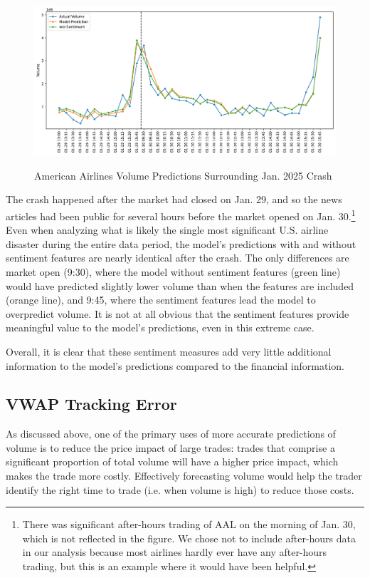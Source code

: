 \documentclass[12pt]{article}
\begin{document}
\begin{figure}[H]
    \centering
    \caption{American Airlines Volume Predictions Surrounding Jan. 2025 Crash}
    \includegraphics[width=\linewidth]{../Output/shap_aal_crash.pdf}
    \label{fig:shapley_aal_crash}
\end{figure}

The crash happened after the market had closed on Jan. 29, and so the news articles had been public for several hours before the market opened on Jan. 30.\footnote{There was significant after-hours trading of AAL on the morning of Jan. 30, which is not reflected in the figure. We chose not to include after-hours data in our analysis because most airlines hardly ever have any after-hours trading, but this is an example where it would have been helpful.} Even when analyzing what is likely the single most significant U.S. airline disaster during the entire data period, the model's predictions with and without sentiment features are nearly identical after the crash. The only differences are market open (9:30), where the model without sentiment features (green line) would have predicted slightly lower volume than when the features are included (orange line), and 9:45, where the sentiment features lead the model to overpredict volume. It is not at all obvious that the sentiment features provide meaningful value to the model's predictions, even in this extreme case.

Overall, it is clear that these sentiment measures add very little additional information to the model's predictions compared to the financial information.

\subsection{VWAP Tracking Error}
As discussed above, one of the primary uses of more accurate predictions of volume is to reduce the price impact of large trades: trades that comprise a significant proportion of total volume will have a higher price impact, which makes the trade more costly. Effectively forecasting volume would help the trader identify the right time to trade (i.e. when volume is high) to reduce those costs.
\end{document}
